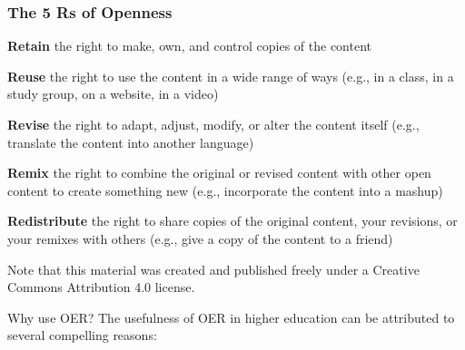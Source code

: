 \documentclass[
  letterpaper,
  DIV=11,
  numbers=noendperiod]{scrreprt}
\begin{document}
\subsubsection*{The 5 Rs of Openness}\label{the-5-rs-of-openness}

\textbf{Retain} the right to make, own, and control copies of the
content

\textbf{Reuse} the right to use the content in a wide range of ways
(e.g., in a class, in a study group, on a website, in a video)

\textbf{Revise} the right to adapt, adjust, modify, or alter the content
itself (e.g., translate the content into another language)

\textbf{Remix} the right to combine the original or revised content with
other open content to create something new (e.g., incorporate the
content into a mashup)

\textbf{Redistribute} the right to share copies of the original content,
your revisions, or your remixes with others (e.g., give a copy of the
content to a friend)

\begin{tcolorbox}[enhanced jigsaw, toprule=.15mm, colback=white, colframe=quarto-callout-note-color-frame, arc=.35mm, opacityback=0, breakable, rightrule=.15mm, bottomrule=.15mm, leftrule=.75mm, left=2mm]

Note that this material was created and published freely under a
Creative Commons Attribution 4.0 license.

\end{tcolorbox}

Why use OER? The usefulness of OER in higher education can be attributed
to several compelling reasons:
\end{document}

